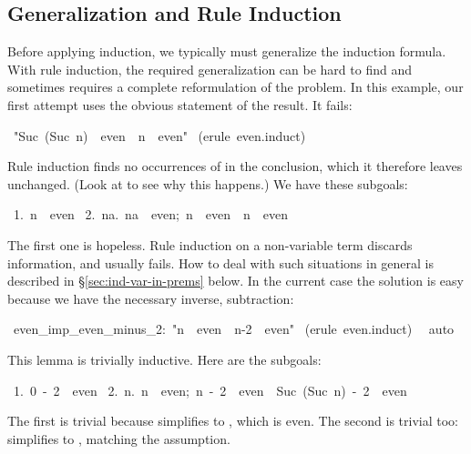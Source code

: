 \subsection{Generalization and Rule Induction}
\label{sec:gen-rule-induction}

%
Before applying induction, we typically must generalize
the induction formula.  With rule induction, the required generalization
can be hard to find and sometimes requires a complete reformulation of the
problem.  In this  example, our first attempt uses the obvious statement of
the result.  It fails:
%
\begin{isabelle}
\ "Suc\ (Suc\ n)\ \isasymin \ even\
\isasymLongrightarrow \ n\ \isasymin \ even"\isanewline
{}\ (erule\ even.induct)\isanewline
{}
\end{isabelle}
%
Rule induction finds no occurrences of  in the
conclusion, which it therefore leaves unchanged.  (Look at
 to see why this happens.)  We have these subgoals:
\begin{isabelle}
\ 1.\ n\ \isasymin \ even\isanewline
\ 2.\ \isasymAnd na.\ \isasymlbrakk na\ \isasymin \ even;\ n\ \isasymin \ even\isasymrbrakk \ \isasymLongrightarrow \ n\ \isasymin \ even%
\end{isabelle}
The first one is hopeless.  Rule induction on
a non-variable term discards information, and usually fails.
How to deal with such situations
in general is described in {\S}\ref{sec:ind-var-in-prems} below.
In the current case the solution is easy because
we have the necessary inverse, subtraction:
\begin{isabelle}
\ even_imp_even_minus_2:\ "n\ \isasymin \ even\ \isasymLongrightarrow \ n-2\ \isasymin \ even"\isanewline
{}\ (erule\ even.induct)\isanewline
\ \isacommand{apply}\ auto\isanewline
{}
\end{isabelle}
%
This lemma is trivially inductive.  Here are the subgoals:
\begin{isabelle}
\ 1.\ 0\ -\ 2\ \isasymin \ even\isanewline
\ 2.\ \isasymAnd n.\ \isasymlbrakk n\ \isasymin \ even;\ n\ -\ 2\ \isasymin \ even\isasymrbrakk \ \isasymLongrightarrow \ Suc\ (Suc\ n)\ -\ 2\ \isasymin \ even%
\end{isabelle}
The first is trivial because  simplifies to , which is
even.  The second is trivial too: \isa{Suc\ (Suc\ n)\ -\ 2} simplifies to
\isa{n}, matching the assumption.%

